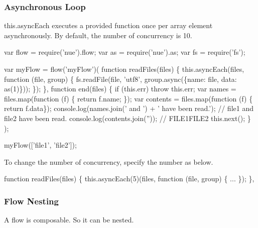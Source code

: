 \subsubsection*{Asynchronous Loop}

{\ttfamily this.\+async\+Each} executes a provided function once per array element asynchronously. By default, the number of concurrency is 10.


\begin{DoxyCode}
var flow = require(\textcolor{stringliteral}{'nue'}).flow;
var as = require(\textcolor{stringliteral}{'nue'}).as;
var fs = require(\textcolor{stringliteral}{'fs'});

var myFlow = flow(\textcolor{stringliteral}{'myFlow'})(
  \textcolor{keyword}{function} readFiles(files) \{
    this.asyncEach(files, \textcolor{keyword}{function} (file, group) \{
      fs.readFile(file, \textcolor{stringliteral}{'utf8'}, group.async(\{name: file, data: as(1)\}));
    \});
  \},
  \textcolor{keyword}{function} end(files) \{
    \textcolor{keywordflow}{if} (this.err) \textcolor{keywordflow}{throw} this.err;
    var names = files.map(\textcolor{keyword}{function} (f) \{ \textcolor{keywordflow}{return} f.name; \});
    var contents = files.map(\textcolor{keyword}{function} (f) \{ \textcolor{keywordflow}{return} f.data\});
    console.log(names.join(\textcolor{stringliteral}{' and '}) + \textcolor{stringliteral}{' have been read.'}); \textcolor{comment}{// file1 and file2 have been read.}
    console.log(contents.join(\textcolor{stringliteral}{''})); \textcolor{comment}{// FILE1FILE2}
    this.next();
  \}
);

myFlow([\textcolor{stringliteral}{'file1'}, \textcolor{stringliteral}{'file2'}]);
\end{DoxyCode}


To change the number of concurrency, specify the number as below.


\begin{DoxyCode}
\textcolor{keyword}{function} readFiles(files) \{
  this.asyncEach(5)(files, \textcolor{keyword}{function} (file, group) \{
     ...
  \});
\},
\end{DoxyCode}


\subsubsection*{Flow Nesting}

A flow is composable. So it can be nested.



